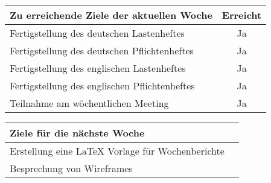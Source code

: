 \begin{tabularx}{\textwidth}{Xc}
    \arrayrulecolor{OliveGreen}
    \toprule
    {\bfseries Zu erreichende Ziele der aktuellen Woche} & {\bfseries Erreicht} \\
    \midrule[2pt]
    Fertigstellung des deutschen Lastenheftes            &Ja                    \\
    \rowcolor{OliveGreen!15}
    Fertigstellung des deutschen Pflichtenheftes         &Ja                    \\
    \rowcolor{White}
    Fertigstellung des englischen Lastenheftes           &Ja                    \\
    \rowcolor{OliveGreen!15}
    Fertigstellung des englischen Pflichtenheftes        &Ja                    \\
    \rowcolor{White}
    Teilnahme am wöchentlichen Meeting                   &Ja                    \\
    \bottomrule[2pt]
\end{tabularx}
%
\vspace{1cm}
%
\begin{tabularx}{\textwidth}{Xc}
    \arrayrulecolor{OliveGreen}
    \toprule
    {\bfseries Ziele für die nächste Woche}              &                      \\
    \midrule[2pt]
    Erstellung eine LaTeX Vorlage für Wochenberichte     &                      \\
    \rowcolor{OliveGreen!15}
    Besprechung von Wireframes                           &                      \\
\end{tabularx}
